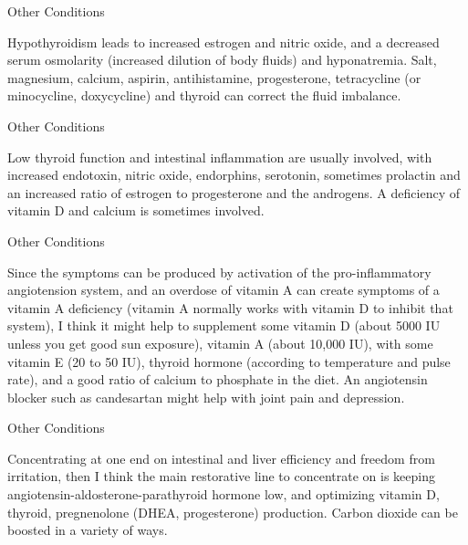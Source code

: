 \documentclass[11pt,oneside,openany,extrafontsizes]{memoir}
\begin{document}
\begin{standalonequote}{Other Conditions}

    \begin{answer}
      Hypothyroidism leads to increased estrogen and nitric oxide, and a decreased serum osmolarity (increased dilution of body fluids) and hyponatremia. Salt, magnesium, calcium, aspirin, antihistamine, progesterone, tetracycline (or minocycline, doxycycline) and thyroid can correct the fluid imbalance.
    \end{answer}
\end{standalonequote}

\begin{standalonequote}{Other Conditions}

    \begin{answer}
       Low thyroid function and intestinal inflammation are usually involved, with increased endotoxin, nitric oxide, endorphins, serotonin, sometimes prolactin and an increased ratio of estrogen to progesterone and the androgens. A deficiency of vitamin D and calcium is sometimes involved. 
    \end{answer}
\end{standalonequote}

\begin{standalonequote}{Other Conditions}

    \begin{answer}
       Since the symptoms can be produced by activation of the pro-inflammatory angiotension system, and an overdose of vitamin A can create symptoms of a vitamin A deficiency (vitamin A normally works with vitamin D to inhibit that system), I think it might help to supplement some vitamin D (about 5000 IU unless you get good sun exposure), vitamin A (about 10,000 IU), with some vitamin E (20 to 50 IU), thyroid hormone (according to temperature and pulse rate), and a good ratio of calcium to phosphate in the diet. An angiotensin blocker such as candesartan might help with joint pain and depression.
    \end{answer}
\end{standalonequote}

\begin{standalonequote}{Other Conditions}

    \begin{answer}
      Concentrating at one end on intestinal and liver efficiency and freedom from irritation, then I think the main restorative line to concentrate on is keeping angiotensin-aldosterone-parathyroid hormone low, and optimizing vitamin D, thyroid, pregnenolone (DHEA, progesterone) production. Carbon dioxide can be boosted in a variety of ways.
    \end{answer}
\end{standalonequote}
\end{document}

